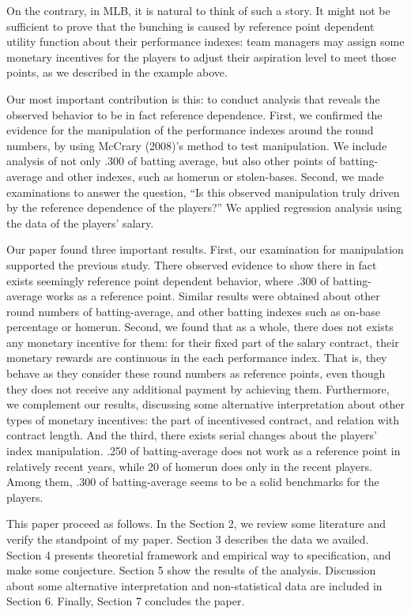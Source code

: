 \documentclass[dvipdfmx, 12pt]{article}
\begin{document}
On the contrary, in MLB, it is natural to think of such a story. It might not be sufficient to prove that the bunching is caused by reference point dependent utility function about their performance indexes: team managers may assign some monetary incentives for the players to adjust their aspiration level to meet those points, as we described in the example above.

Our most important contribution is this: to conduct analysis that reveals the observed behavior to be in fact reference dependence. First, we confirmed the evidence for the manipulation of the performance indexes around the round numbers, by using McCrary (2008)'s method to test manipulation. We include analysis of not only .300 of batting average, but also other points of batting-average and other indexes, such as homerun or stolen-bases. Second, we made examinations to answer the question, ``Is this observed manipulation truly driven by the reference dependence of the players?'' We applied regression analysis using the data of the players' salary.

Our paper found three important results. First, our examination for manipulation supported the previous study. There observed evidence to show there in fact exists seemingly reference point dependent behavior, where .300 of batting-average works as a reference point. Similar results were obtained about other round numbers of batting-average, and other batting indexes such as on-base percentage or homerun. Second, we found that as a whole, there does not exists any monetary incentive for them: for their fixed part of the salary contract, their monetary rewards are continuous in the each performance index. That is, they behave as they consider these round numbers as reference points, even though they does not receive any additional payment by achieving them. Furthermore, we complement our results, discussing some alternative interpretation about other types of monetary incentives: the part of incentivesed contract, and relation with contract length. And the third, there exists serial changes about the players' index manipulation. .250 of batting-average does not work as a reference point in relatively recent years, while 20 of homerun does only in the recent players. Among them, .300 of batting-average seems to be a solid benchmarks for the players.

This paper proceed as follows. In the Section 2, we review some literature and verify the standpoint of my paper. Section 3 describes the data we availed. Section 4 presents theoretial framework and empirical way to specification, and make some conjecture.  Section 5 show the results of the analysis. Discussion about some alternative interpretation and non-statistical data are included in Section 6. Finally, Section 7 concludes the paper.
\end{document}
